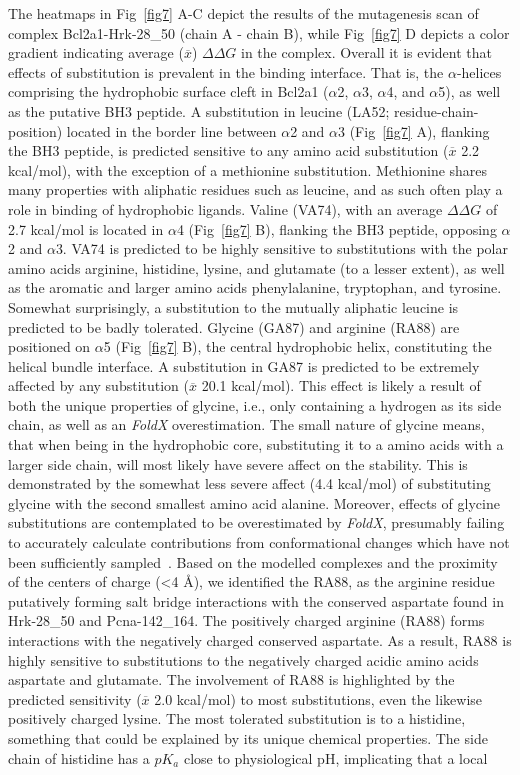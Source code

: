 \documentclass[10pt,letterpaper]{article}
\begin{document}
The heatmaps in Fig~\ref{fig7} A-C depict the results of the mutagenesis scan of complex Bcl2a1-Hrk-28\_50 (chain A - chain B), while Fig~\ref{fig7} D depicts a color gradient indicating average ($\overline{x}$) $\Delta\Delta G$ in the complex. Overall it is evident that effects of substitution is prevalent in the binding interface. That is, the $\alpha$-helices comprising the hydrophobic surface cleft in Bcl2a1 ($\alpha$2, $\alpha$3, $\alpha$4, and $\alpha$5), as well as the putative BH3 peptide. A substitution in leucine (LA52; residue-chain-position) located in the border line between $\alpha$2 and $\alpha$3 (Fig~\ref{fig7} A), flanking the BH3 peptide, is predicted sensitive to any amino acid substitution ($\overline{x}$ 2.2 kcal/mol), with the exception of a methionine substitution. Methionine shares many properties with aliphatic residues such as leucine, and as such often play a role in binding of hydrophobic ligands. Valine (VA74), with an average $\Delta\Delta G$ of 2.7 kcal/mol is located in $\alpha$4 (Fig~\ref{fig7} B), flanking the BH3 peptide, opposing $\alpha$2 and $\alpha$3. VA74 is predicted to be highly sensitive to substitutions with the polar amino acids arginine, histidine, lysine, and glutamate (to a lesser extent), as well as the aromatic and larger amino acids phenylalanine, tryptophan, and tyrosine. Somewhat surprisingly, a substitution to the mutually aliphatic leucine is predicted to be badly tolerated. Glycine (GA87) and arginine (RA88) are positioned on $\alpha$5 (Fig~\ref{fig7} B), the central hydrophobic helix, constituting the helical bundle interface. A substitution in GA87 is predicted to be extremely affected by any substitution ($\overline{x}$ 20.1 kcal/mol). This effect is likely a result of both the unique properties of glycine, i.e., only containing a hydrogen as its side chain, as well as an \textit{FoldX} overestimation. The small nature of glycine means, that when being in the hydrophobic core, substituting it to a amino acids with a larger side chain, will most likely have severe affect on the stability. This is demonstrated by the somewhat less severe affect (4.4 kcal/mol) of substituting glycine with the second smallest amino acid alanine. Moreover, effects of glycine substitutions are contemplated to be overestimated by \textit{FoldX}, presumably failing to accurately calculate contributions from conformational changes which have not been sufficiently sampled~\cite{Tiberti}. Based on the modelled complexes and the proximity of the centers of charge (\textless 4 \r{A}), we identified the RA88, as the arginine residue putatively forming salt bridge interactions with the conserved aspartate found in Hrk-28\_50 and Pcna-142\_164. The positively charged arginine (RA88) forms interactions with the negatively charged conserved aspartate. As a result, RA88 is highly sensitive to substitutions to the negatively charged acidic amino acids aspartate and glutamate. The involvement of RA88 is highlighted by the predicted sensitivity ($\overline{x}$ 2.0 kcal/mol) to most substitutions, even the likewise positively charged lysine. The most tolerated substitution is to a histidine, something that could be explained by its unique chemical properties. The side chain of histidine has a $pK_{a}$ close to physiological pH, implicating that a local 
\end{document}
